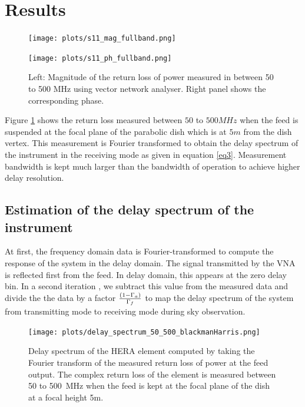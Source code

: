 \documentclass[twocolumn]{emulateapj}
\begin{document}
\section{Results}
\begin{figure}[ht]
\begin{minipage}[b]{0.5\linewidth}
\centering
\texttt{[image: plots/s11\_mag\_fullband.png]}
\end{minipage}
\hspace{0.1cm}
\begin{minipage}[b]{0.5\linewidth}
\centering
\texttt{[image: plots/s11\_ph\_fullband.png]}
\end{minipage}
\caption{Left: Magnitude of the return loss of power measured in between 50 to 500 MHz using vector network analyser. Right panel shows the corresponding phase.}
\label{fig:freq}       
\end{figure}

Figure \ref{fig:freq} shows the return loss measured between $50$ to
$500MHz$ when the feed is suspended at the focal plane of the parabolic dish which is at $5m$ from the dish vertex. This measurement is Fourier transformed to obtain the delay spectrum of the instrument in the receiving mode as given in equation \ref{eq3}. Measurement bandwidth is kept much larger than the bandwidth of operation to achieve higher delay resolution.

\subsection{Estimation of the delay spectrum of the instrument}
At first, the frequency domain data is Fourier-transformed to compute the response of the system in the delay domain. The signal transmitted by the VNA is reflected first from the feed. In delay domain, this appears at the zero delay bin. In a second iteration , we subtract this value from the measured data and divide the the data by a factor ${(1-\Gamma_{a})\over \Gamma_{f}}$ to map the delay spectrum of the system from transmitting mode to receiving mode during sky observation.  

\begin{figure}
\centering
\texttt{[image: plots/delay\_spectrum\_50\_500\_blackmanHarris.png]}
\caption{Delay spectrum of the HERA element computed by taking the Fourier transform of the measured return loss of power at the feed output. The complex return loss of the element is measured between 50 to 500~MHz when the feed is kept at the focal plane of the dish at a focal height 5m.}
\label{fig:window}
\end{figure}
\end{document}
